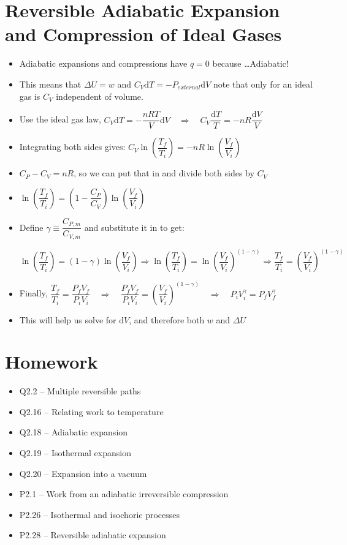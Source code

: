 \documentclass[12pt, openany, letterpaper]{memoir}
\begin{document}
\section*{Reversible Adiabatic Expansion and Compression of Ideal Gases}
\begin{itemize}
	\item Adiabatic expansions and compressions have $q=0$ because \ldots Adiabatic!
	\item This means that $\Delta U = w$ and $C_V\mathrm{d}T = -P_{external}\mathrm{d}V$ note that only for an ideal gas is $C_V$ independent of volume.
	\item Use the ideal gas law, $C_V\mathrm{d}T = -\dfrac{nRT}{V}\mathrm{d}V \hspace{1em}\Rightarrow\hspace{1em} C_V\dfrac{\mathrm{d}T}{T} = -nR\dfrac{\mathrm{d}V}{V}$
	\item Integrating both sides gives: $C_V\ln\left(\dfrac{T_f}{T_i}\right)=-nR\ln\left(\dfrac{V_f}{V_i}\right)$
	\item $C_P - C_V = nR$, so we can put that in and divide both sides by $C_V$
	\item $\ln\left(\dfrac{T_f}{T_i}\right)=(1-\dfrac{C_P}{C_V})\ln\left(\dfrac{V_f}{V_i}\right)$
	\item Define $\gamma \equiv \dfrac{C_{P,m}}{C_{V,m}}$ and substitute it in to get:
	
	 $\ln\left(\dfrac{T_f}{T_i}\right)=(1-\gamma)\ln\left(\dfrac{V_f}{V_i}\right) \Rightarrow \ln\left(\dfrac{T_f}{T_i}\right)=\ln\left(\dfrac{V_f}{V_i}\right)^{(1-\gamma)} \Rightarrow \dfrac{T_f}{T_i}=\left(\dfrac{V_f}{V_i}\right)^{(1-\gamma)}$
	 \item Finally, $\dfrac{T_f}{T_i} = \dfrac{P_fV_f}{P_iV_i} \hspace{1em}\Rightarrow\hspace{1em} \dfrac{P_fV_f}{P_iV_i}=\left(\dfrac{V_f}{V_i}\right)^{(1-\gamma)} \hspace{1em}\Rightarrow\hspace{1em} P_iV_i^\gamma=P_fV_f^\gamma$
	 \item This will help us solve for $\mathrm{d}V$, and therefore both $w$ and $\Delta U$
\end{itemize}
\section*{Homework}
\begin{itemize}
	\item Q2.2 -- Multiple reversible paths
	\item Q2.16 -- Relating work to temperature
	\item Q2.18 -- Adiabatic expansion
	\item Q2.19 -- Isothermal expansion
	\item Q2.20 -- Expansion into a vacuum
	\item P2.1 -- Work from an adiabatic irreversible compression
	\item P2.26 -- Isothermal and isochoric processes
	\item P2.28 -- Reversible adiabatic expansion
	
\end{itemize}
\end{document}
